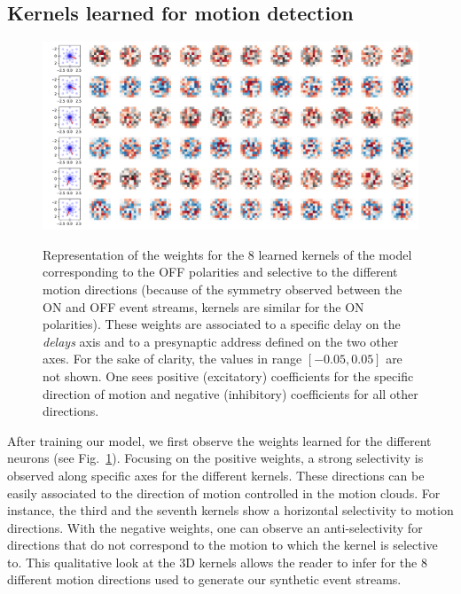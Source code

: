 \documentclass[default]{sn-jnl}%
\theoremstyle{thmstyleone}%
\theoremstyle{thmstyletwo}%
\theoremstyle{thmstylethree}%
\newcommand{\seeFig}[1]{see Fig.~\ref{fig:#1}}%
\begin{document}
\subsection{Kernels learned for motion detection}
\begin{figure}[ht!]
    {\centering
    \includegraphics[width=\linewidth]{figures/motion_kernels.pdf}
    }
    \caption{
    	Representation of the weights for the $8$ learned kernels of the model corresponding to the OFF polarities and selective to the different motion directions
	(because of the symmetry observed between the ON and OFF event streams, kernels are similar for the ON polarities). These weights are associated to a specific delay on the \textit{delays} axis and to a presynaptic address defined on the two other axes.
	For the sake of clarity, the values in range $[-0.05, 0.05]$ are not shown. One sees positive (excitatory) coefficients for the specific direction of motion and negative (inhibitory) coefficients for all other directions.
	}
    \label{fig:kernels}
\end{figure} 
%
%
After training our model, we first observe the weights learned for the different neurons (\seeFig{kernels}). Focusing on the positive weights, a strong selectivity is observed along specific axes for the different kernels. These directions can be easily associated to the direction of motion controlled in the motion clouds. For instance, the third and the seventh kernels show a horizontal selectivity to motion directions.
%
With the negative weights, one can observe an anti-selectivity for directions that do not correspond to the motion to which the kernel is selective to. This qualitative look at the 3D kernels allows the reader to infer for the $8$ different motion directions used to generate our synthetic event streams.
\end{document}
